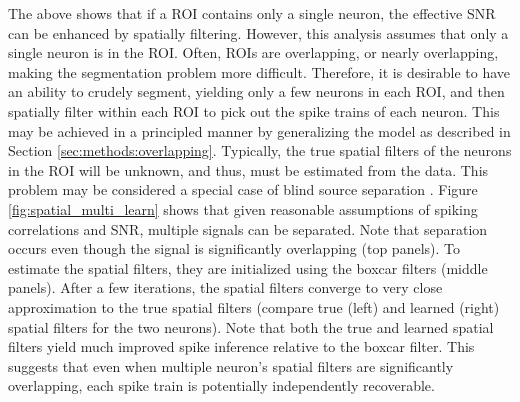 The above shows that if a ROI contains only a single neuron, the effective SNR can be enhanced by spatially filtering.  However, this analysis assumes that only a single neuron is in the ROI.  Often, ROIs are overlapping, or nearly overlapping, making the segmentation problem more difficult.  Therefore, it is desirable to have an ability to crudely segment, yielding only a few neurons in each ROI, and then spatially filter within each ROI to pick out the spike trains of each neuron.  This may be achieved in a principled manner by generalizing the model as described in Section \ref{sec:methods:overlapping}.  %
Typically, the true spatial filters of the neurons in the ROI will be unknown, and thus, must be estimated from the data.  This problem may be considered a special case of blind source separation \cite{BellSejnowski95, MukamelSchnitzer09}. Figure \ref{fig:spatial_multi_learn} shows that given reasonable assumptions of spiking correlations and SNR,  multiple signals can be separated.  Note that separation occurs even though the signal is significantly overlapping (top panels). To estimate the spatial filters, they are initialized using the boxcar filters (middle panels).  After a few iterations, the spatial filters converge to very close approximation to the true spatial filters (compare true (left) and learned (right) spatial filters for the two neurons).  Note that both the true and learned spatial filters yield much improved spike inference relative to the boxcar filter.  This suggests that even when multiple neuron's spatial filters are significantly overlapping, each spike train is potentially independently recoverable.  




